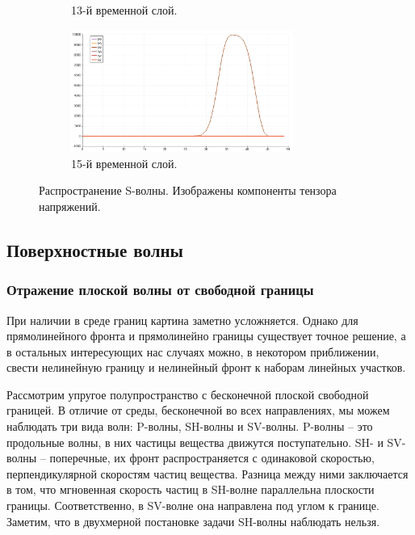 \begin{figure}[htp]
\begin{subfigure}[b]{0.5\textwidth}
\caption{13-й временной слой.}
\end{subfigure}
\begin{subfigure}[b]{0.5\textwidth}
\centering
\includegraphics[width=0.8\textwidth]{png/s-wave-test/s/0015.png}
\caption{15-й временной слой.}
\end{subfigure}
\caption{Распространение S-волны. Изображены компоненты тензора напряжений.}
\label{pic:s_wave}
\end{figure}


\clearpage
\newpage


\subsection{Поверхностные волны}

\subsubsection{Отражение плоской волны от свободной границы}

При наличии в среде границ картина заметно усложняется. Однако для прямолинейного фронта и прямолинейно границы существует точное решение, а в остальных интересующих нас случаях можно, в некотором приближении, свести нелинейную границу и нелинейный фронт к наборам линейных участков.

Рассмотрим упругое полупространство с бесконечной плоской свободной границей. В отличие от среды, бесконечной во всех направлениях, мы можем наблюдать три вида волн: P-волны, SH-волны и SV-волны. P-волны – это продольные волны, в них частицы вещества движутся поступательно. SH- и SV-волны – поперечные, их фронт распространяется с одинаковой скоростью, перпендикулярной  скоростям частиц вещества. Разница между ними заключается в том, что мгновенная скорость частиц в SH-волне параллельна плоскости границы. Соответственно, в SV-волне она направлена под углом к границе. Заметим, что в двухмерной постановке задачи SH-волны наблюдать нельзя.

